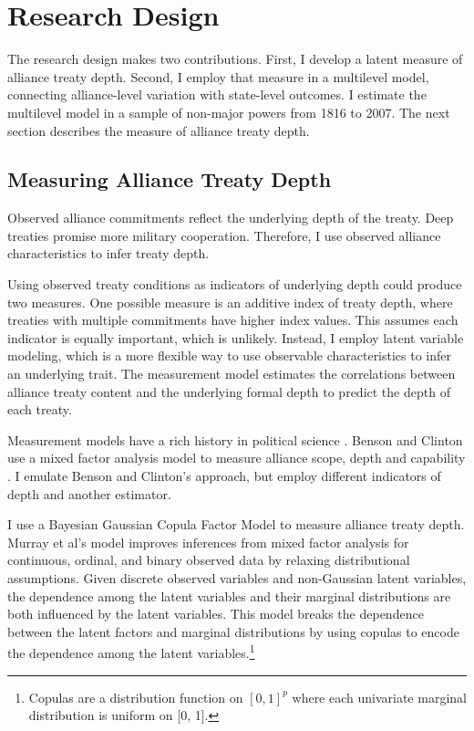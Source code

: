 \documentclass[12pt]{article}
\begin{document}
\section{Research Design} 


The research design makes two contributions. 
First, I develop a latent measure of alliance treaty depth. 
Second, I employ that measure in a multilevel model, connecting alliance-level variation with state-level outcomes. 
I estimate the multilevel model in a sample of non-major powers from 1816 to 2007. 
The next section describes the measure of alliance treaty depth. 


\subsection{Measuring Alliance Treaty Depth} 


Observed alliance commitments reflect the underlying depth of the treaty. 
Deep treaties promise more military cooperation. 
Therefore, I use observed alliance characteristics to infer treaty depth.


Using observed treaty conditions as indicators of underlying depth could produce two measures. 
One possible measure is an additive index of treaty depth, where treaties with multiple commitments have higher index values. 
This assumes each indicator is equally important, which is unlikely. 
Instead, I employ latent variable modeling, which is a more flexible way to use observable characteristics to infer an underlying trait.  
The measurement model estimates the correlations between alliance treaty content and the underlying formal depth to predict the depth of each treaty. 


Measurement models have a rich history in political science \citep{Clintonetal2004, TreierJackman2008, Fariss2014}.
Benson and Clinton use a mixed factor analysis model to measure alliance scope, depth and capability \citep{BensonClinton2016, Quinn2004}.  
I emulate Benson and Clinton's approach, but employ different indicators of depth and another estimator. 


I use a Bayesian Gaussian Copula Factor Model \citep{Murrayetal2013} to measure alliance treaty depth. 
Murray et al's model improves inferences from mixed factor analysis for continuous, ordinal, and binary observed data by relaxing distributional assumptions. 
Given discrete observed variables and non-Gaussian latent variables, the dependence among the latent variables and their marginal distributions are both influenced by the latent variables.
This model breaks the dependence between the latent factors and marginal distributions by using copulas to encode the dependence among the latent variables.\footnote{Copulas are a distribution function on $[0, 1]^p$ where each univariate marginal distribution is uniform on [0, 1].}
\end{document}
